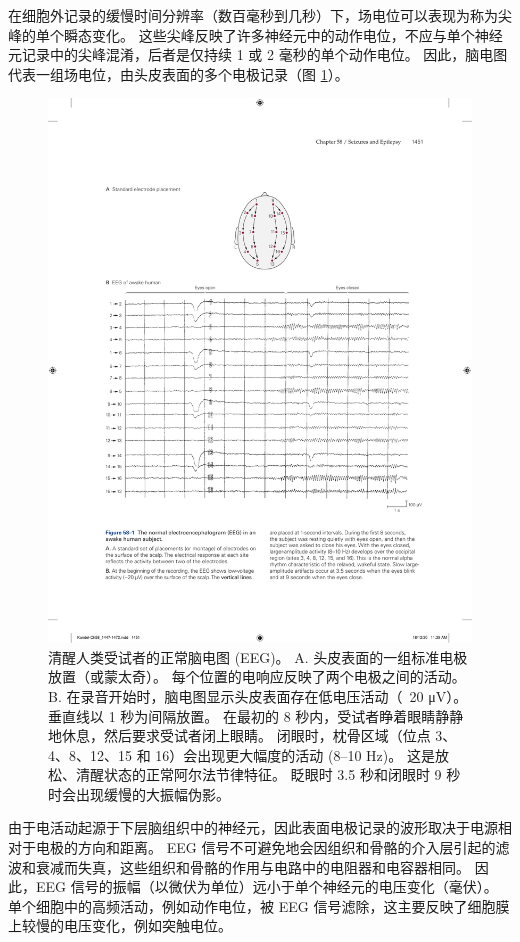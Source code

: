 在细胞外记录的缓慢时间分辨率（数百毫秒到几秒）下，场电位可以表现为称为尖峰的单个瞬态变化。 这些尖峰反映了许多神经元中的动作电位，不应与单个神经元记录中的尖峰混淆，后者是仅持续 1 或 2 毫秒的单个动作电位。 因此，脑电图代表一组场电位，由头皮表面的多个电极记录（图 \ref{fig:58_1}）。

\begin{figure}[htbp]
	\centering
	\includegraphics[width=0.95\linewidth]{chap58/fig_58_1}
	\caption{清醒人类受试者的正常脑电图 (EEG)。 A. 头皮表面的一组标准电极放置（或蒙太奇）。 每个位置的电响应反映了两个电极之间的活动。 B. 在录音开始时，脑电图显示头皮表面存在低电压活动（~20 μV）。 垂直线以 1 秒为间隔放置。 在最初的 8 秒内，受试者睁着眼睛静静地休息，然后要求受试者闭上眼睛。 闭眼时，枕骨区域（位点 3、4、8、12、15 和 16）会出现更大幅度的活动 (8–10 Hz)。 这是放松、清醒状态的正常阿尔法节律特征。 眨眼时 3.5 秒和闭眼时 9 秒时会出现缓慢的大振幅伪影。}
	\label{fig:58_1}
\end{figure}

由于电活动起源于下层脑组织中的神经元，因此表面电极记录的波形取决于电源相对于电极的方向和距离。 EEG 信号不可避免地会因组织和骨骼的介入层引起的滤波和衰减而失真，这些组织和骨骼的作用与电路中的电阻器和电容器相同。 因此，EEG 信号的振幅（以微伏为单位）远小于单个神经元的电压变化（毫伏）。 单个细胞中的高频活动，例如动作电位，被 EEG 信号滤除，这主要反映了细胞膜上较慢的电压变化，例如突触电位。

